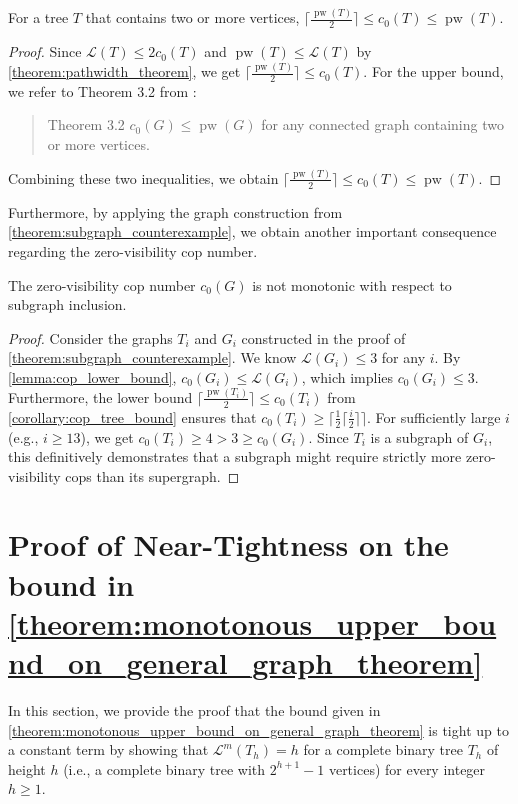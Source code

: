 \documentclass[a4paper,UKenglish,cleveref, autoref, thm-restate]{lipics-v2021}
\begin{document}
\begin{corollary}\label{corollary:cop_tree_bound}
    For a tree $T$ that contains two or more vertices, $\lceil{\frac{\operatorname{pw}(T)}{2}}\rceil \leq c_0(T) \leq \operatorname{pw}(T)$.
\end{corollary}
\begin{proof}
Since $\mathcal{L}(T) \le 2c_0(T)$ and $\operatorname{pw}(T)\le \mathcal{L}(T)$ by \cref{theorem:pathwidth_theorem}, we get $\lceil{\frac{\operatorname{pw}(T)}{2}}\rceil \leq c_0(T)$.
For the upper bound, we refer to Theorem 3.2 from \cite{dereniowski2015zero}:
\begin{quote}
Theorem 3.2 $c_0(G) \leq \operatorname{pw}(G)$ for any connected graph containing two or more vertices.
\end{quote}
Combining these two inequalities, we obtain $\lceil{\frac{\operatorname{pw}(T)}{2}}\rceil \leq c_0(T) \leq \operatorname{pw}(T)$.
\end{proof}
Furthermore, by applying the graph construction from \cref{theorem:subgraph_counterexample}, we obtain another important consequence regarding the zero-visibility cop number.
\begin{corollary}
    The zero-visibility cop number $c_0(G)$ is not monotonic with respect to subgraph inclusion.
\end{corollary}
\begin{proof}
    Consider the graphs $T_i$ and $G_i$ constructed in the proof of \cref{theorem:subgraph_counterexample}. We know $\mathcal{L}(G_i)\leq3$ for any $i$.
    By \cref{lemma:cop_lower_bound}, $c_0(G_i) \le \mathcal{L}(G_i)$, which implies $c_0(G_i) \le 3$.
    Furthermore, the lower bound $\lceil{\frac{\operatorname{pw}(T_i)}{2}}\rceil \leq c_0(T_i)$ from \cref{corollary:cop_tree_bound} ensures that $c_0(T_i) \ge \lceil \frac{1}{2} \lceil \frac{i}{2} \rceil \rceil$.
    For sufficiently large $i$ (e.g., $i \ge 13$), we get $c_0(T_i) \ge 4 > 3 \ge c_0(G_i)$.
    Since $T_i$ is a subgraph of $G_i$, this definitively demonstrates that a subgraph might require strictly more zero-visibility cops than its supergraph.
\end{proof}


\section{Proof of Near-Tightness on the bound in \cref{theorem:monotonous_upper_bound_on_general_graph_theorem}}\label{sec:appendixproof}
In this section, we provide the proof that the bound given in \cref{theorem:monotonous_upper_bound_on_general_graph_theorem} is tight up to a constant term by showing that $\mathcal{L}^m(T_h) = h$ for a complete binary tree $T_h$ of height $h$ (i.e., a complete binary tree with $2^{h+1}-1$ vertices) for every integer $h \ge 1$.
\end{document}
